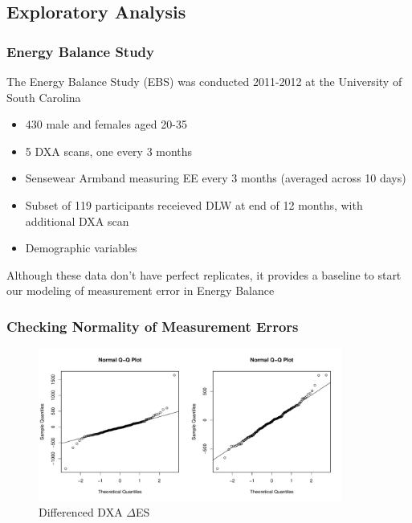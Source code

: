 \documentclass[handout]{beamer}\usepackage[]{graphicx}\usepackage[]{color}
\begin{document}
\subsection{Exploratory Analysis}

\begin{frame}
\frametitle{Energy Balance Study}
The Energy Balance Study (EBS) was conducted 2011-2012 at the University of South Carolina
\begin{itemize}
\item
430 male and females aged 20-35 \\
\item
5 DXA scans, one every 3 months
\item
Sensewear Armband measuring EE every 3 months (averaged across 10 days)
\item
Subset of 119 participants receieved DLW at end of 12 months, with additional DXA scan
\item
Demographic variables
\end{itemize}

\vspace{0.2cm}

Although these data don't have perfect replicates, it provides a baseline to start our modeling of measurement error in Energy Balance


\end{frame}

\begin{frame}
\frametitle{Checking Normality of Measurement Errors}

\begin{figure}
\centering
\includegraphics[width=10cm,height=5cm]{dxa_qq.pdf}
\caption{\small{Differenced DXA $\Delta$ES }}
\end{figure}

\end{frame}
\end{document}
